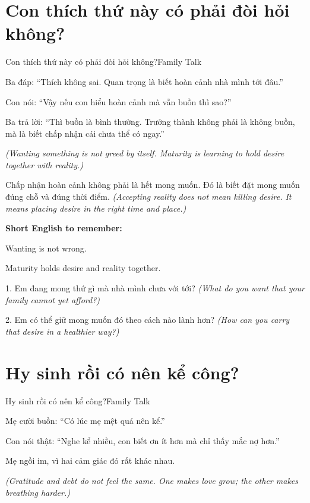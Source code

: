 \section{Con thích thứ này có phải đòi hỏi không?}
\begin{truyen}{Con thích thứ này có phải đòi hỏi không?}{Family Talk}

Ba đáp: ``Thích không sai. Quan trọng là biết hoàn cảnh nhà mình tới đâu.''

Con nói: ``Vậy nếu con hiểu hoàn cảnh mà vẫn buồn thì sao?''

Ba trả lời: ``Thì buồn là bình thường. Trưởng thành không phải là không buồn, mà là biết chấp nhận cái chưa thể có ngay.''

\textit{(Wanting something is not greed by itself. Maturity is learning to hold desire together with reality.)}
\end{truyen}

\begin{baihoc}
Chấp nhận hoàn cảnh không phải là hết mong muốn. Đó là biết đặt mong muốn đúng chỗ và đúng thời điểm.
\textit{(Accepting reality does not mean killing desire. It means placing desire in the right time and place.)}
\end{baihoc}

\begin{ghinhoanh}
\textbf{Short English to remember:}

Wanting is not wrong.

Maturity holds desire and reality together.
\end{ghinhoanh}

\begin{tuhocnhanh}
1. Em đang mong thứ gì mà nhà mình chưa với tới? \textit{(What do you want that your family cannot yet afford?)}

2. Em có thể giữ mong muốn đó theo cách nào lành hơn? \textit{(How can you carry that desire in a healthier way?)}
\end{tuhocnhanh}
\ngancach

\section{Hy sinh rồi có nên kể công?}
\begin{truyen}{Hy sinh rồi có nên kể công?}{Family Talk}

Mẹ cười buồn: ``Có lúc mẹ mệt quá nên kể.''

Con nói thật: ``Nghe kể nhiều, con biết ơn ít hơn mà chỉ thấy mắc nợ hơn.''

Mẹ ngồi im, vì hai cảm giác đó rất khác nhau.

\textit{(Gratitude and debt do not feel the same. One makes love grow; the other makes breathing harder.)}
\end{truyen}

